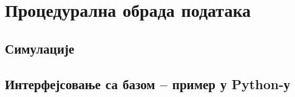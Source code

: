 \chapter{Процедурална обрада података}\label{ch:\thechapter}


\section{Симулације}

\section{Интерфејсовање са базом -- пример у Python-у}